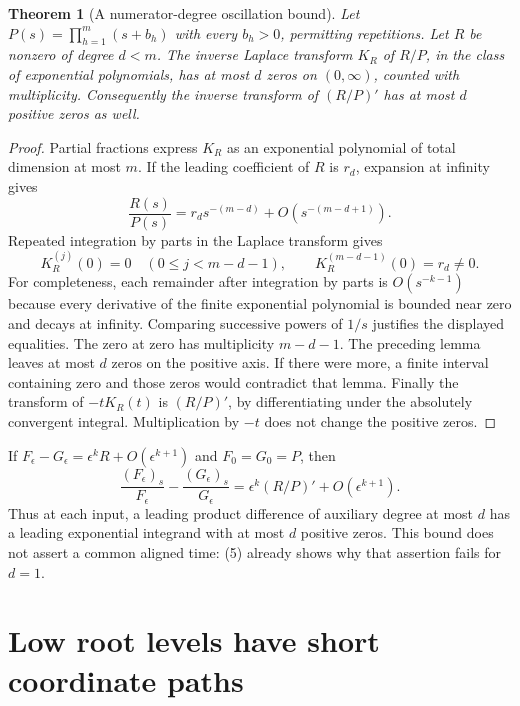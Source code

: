 \documentclass[11pt]{article}
\newtheorem{theorem}{Theorem}
\begin{document}
\begin{theorem}[A numerator-degree oscillation bound]
Let $P(s)=\prod_{h=1}^m(s+b_h)$ with every $b_h>0$, permitting
repetitions. Let $R$ be nonzero of degree $d<m$. The inverse Laplace
transform $K_R$ of $R/P$, in the class of exponential polynomials,
has at most $d$ zeros on $(0,\infty)$, counted with multiplicity.
Consequently the inverse transform of $(R/P)'$ has at most $d$
positive zeros as well.
\end{theorem}
\begin{proof}
Partial fractions express $K_R$ as an exponential polynomial of total
dimension at most $m$. If the leading coefficient of $R$ is $r_d$,
expansion at infinity gives
\[
       \frac{R(s)}{P(s)}=r_ds^{-(m-d)}+O(s^{-(m-d+1)}).
\]
Repeated integration by parts in the Laplace transform gives
\[
 K_R^{(j)}(0)=0\quad(0\le j<m-d-1),\qquad
 K_R^{(m-d-1)}(0)=r_d\ne0.
\]
For completeness, each remainder after integration by parts is
$O(s^{-k-1})$ because every derivative of the finite exponential
polynomial is bounded near zero and decays at infinity. Comparing
successive powers of $1/s$ justifies the displayed equalities.
The zero at zero has multiplicity $m-d-1$. The preceding lemma leaves
at most $d$ zeros on the positive axis. If there were more, a finite
interval containing zero and those zeros would contradict that lemma.
Finally the transform of $-tK_R(t)$ is $(R/P)'$, by differentiating
under the absolutely convergent integral. Multiplication by $-t$
does not change the positive zeros.
\end{proof}

If $F_\epsilon-G_\epsilon=\epsilon^kR+O(\epsilon^{k+1})$ and
$F_0=G_0=P$, then
\[
 \frac{(F_\epsilon)_s}{F_\epsilon}
       -\frac{(G_\epsilon)_s}{G_\epsilon}
       =\epsilon^k(R/P)'+O(\epsilon^{k+1}).
 \tag{6}
\]
Thus at each input, a leading product difference of auxiliary degree
at most $d$ has a leading exponential integrand with at most $d$
positive zeros. This bound does not assert a common aligned time:
(5) already shows why that assertion fails for $d=1$.

\section{Low root levels have short coordinate paths}
\end{document}
